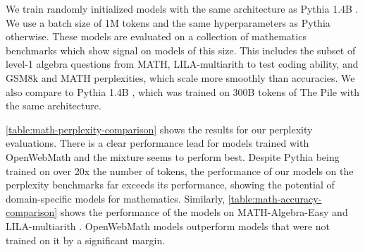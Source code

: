 We train randomly initialized models with the same architecture as Pythia 1.4B \citep{pythia}. We use a batch size of 1M tokens and the same hyperparameters as Pythia otherwise. These models are evaluated on a collection of mathematics benchmarks which show signal on models of this size. This includes the subset of level-1 algebra questions from MATH, LILA-multiarith to test coding ability, and GSM8k and MATH perplexities, which scale more smoothly than accuracies. We also compare to Pythia 1.4B \citep{pythia}, which was trained on 300B tokens of The Pile \citep{gao2020pile} with the same architecture.

\autoref{table:math-perplexity-comparison} shows the results for our perplexity evaluations. There is a clear performance lead for models trained with OpenWebMath and the mixture seems to perform best. Despite Pythia being trained on over 20x the number of tokens, the performance of our models on the perplexity benchmarks far exceeds its performance, showing the potential of domain-specific models for mathematics. Similarly, \autoref{table:math-accuracy-comparison} shows the performance of the models on MATH-Algebra-Easy and LILA-multiarith \citep{lila}. OpenWebMath models outperform models that were not trained on it by a significant margin.